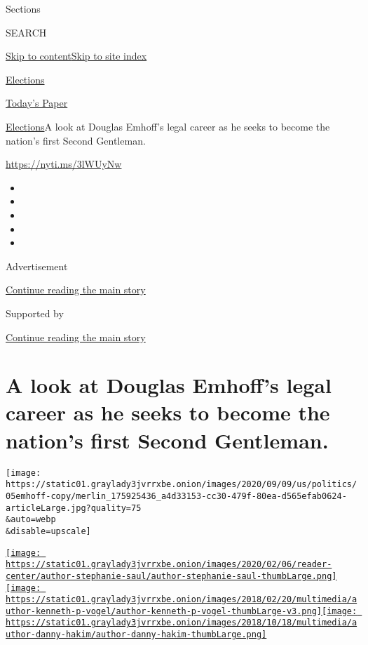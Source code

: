 Sections

SEARCH

\protect\hyperlink{site-content}{Skip to
content}\protect\hyperlink{site-index}{Skip to site index}

\href{https://www.nytimes3xbfgragh.onion/news-event/2020-election}{Elections}

\href{https://myaccount.nytimes3xbfgragh.onion/auth/login?response_type=cookie\&client_id=vi}{}

\href{https://www.nytimes3xbfgragh.onion/section/todayspaper}{Today's
Paper}

\href{/news-event/2020-election}{Elections}\textbar{}A look at Douglas
Emhoff's legal career as he seeks to become the nation's first Second
Gentleman.

\url{https://nyti.ms/3lWUyNw}

\begin{itemize}
\item
\item
\item
\item
\item
\end{itemize}

Advertisement

\protect\hyperlink{after-top}{Continue reading the main story}

Supported by

\protect\hyperlink{after-sponsor}{Continue reading the main story}

\hypertarget{a-look-at-douglas-emhoffs-legal-career-as-he-seeks-to-become-the-nations-first-second-gentleman}{%
\section{A look at Douglas Emhoff's legal career as he seeks to become
the nation's first Second
Gentleman.}\label{a-look-at-douglas-emhoffs-legal-career-as-he-seeks-to-become-the-nations-first-second-gentleman}}

\texttt{[image: https://static01.graylady3jvrrxbe.onion/images/2020/09/09/us/politics/05emhoff-copy/merlin\_175925436\_a4d33153-cc30-479f-80ea-d565efab0624-articleLarge.jpg?quality=75\\\&auto=webp\\\&disable=upscale]}

\href{https://www.nytimes3xbfgragh.onion/by/stephanie-saul}{\texttt{[image: https://static01.graylady3jvrrxbe.onion/images/2020/02/06/reader-center/author-stephanie-saul/author-stephanie-saul-thumbLarge.png]}}\href{https://www.nytimes3xbfgragh.onion/by/kenneth-p-vogel}{\texttt{[image: https://static01.graylady3jvrrxbe.onion/images/2018/02/20/multimedia/author-kenneth-p-vogel/author-kenneth-p-vogel-thumbLarge-v3.png]}}\href{https://www.nytimes3xbfgragh.onion/by/danny-hakim}{\texttt{[image: https://static01.graylady3jvrrxbe.onion/images/2018/10/18/multimedia/author-danny-hakim/author-danny-hakim-thumbLarge.png]}}


